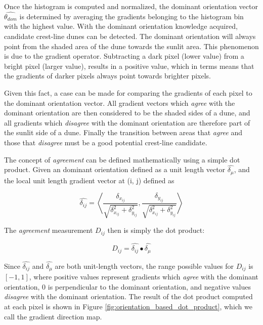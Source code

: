 Once the histogram is computed and normalized, the dominant orientation vector $\hat{\theta_{dom}}$ is determined by averaging the gradients belonging to the histogram bin with the highest value. With the dominant orientation knowledge acquired, candidate crest-line dunes can be detected. The dominant orientation will always point from the shaded area of the dune towards the sunlit area. This phenomenon is due to the gradient operator. Subtracting a dark pixel (lower value) from a bright pixel (larger value), results in a positive value, which in terms means that the gradients of darker pixels always point towards brighter pixels.

Given this fact, a case can be made for comparing the gradients of each pixel to the dominant orientation vector. All gradient vectors which \emph{agree} with the dominant orientation are then considered to be the shaded sides of a dune, and all gradients which \emph{disagree} with the dominant orientation are therefore part of the sunlit side of a dune. Finally the transition between areas that \emph{agree} and those that \emph{disagree} must be a good potential crest-line candidate.

The concept of \emph{agreement} can be defined mathematically using a simple dot product. Given an dominant orientation defined as a unit length vector $\hat{\delta_{\mu}}$, and the local unit length gradient vector at (i, j) defined as

\begin{equation}
\hat{\delta_{ij}} = \left\langle \frac{\delta_{x_{ij}}}{\sqrt{\delta_{x_{ij}}^2 + \delta_{y_{ij}}^2}}, \frac{\delta_{y_{ij}}}{\sqrt{\delta_{x_{ij}}^2 + \delta_{y_{ij}}^2}}\right\rangle 
\end{equation}

The \emph{agreement} measurement $D_{ij}$ then is simply the dot product:

\begin{equation}
D_{ij} = \hat{\delta_{ij}} \bullet \hat{\delta_{\mu}}
\end{equation}

Since $\hat{\delta_{ij}}$ and $\hat{\delta_{\mu}}$ are both unit-length vectors, the range possible values for $D_{ij}$ is $[-1, 1]$, where positive values represent gradients which \emph{agree} with the dominant orientation, 0 is perpendicular to the dominant orientation, and negative values \emph{disagree} with the dominant orientation. The result of the dot product computed at each pixel is shown in Figure \ref{fig:orientation_based_dot_product}, which we call the gradient direction map.

